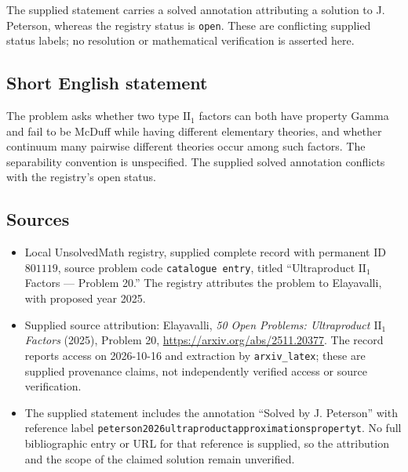 \documentclass[11pt]{article}
\begin{document}
The supplied statement carries a solved annotation attributing a solution to J. Peterson, whereas the registry status is \texttt{open}. These are conflicting supplied status labels; no resolution or mathematical verification is asserted here.
\subsection{Short English statement}
The problem asks whether two type \(\mathrm{II}_1\) factors can both have property Gamma and fail to be McDuff while having different elementary theories, and whether continuum many pairwise different theories occur among such factors. The separability convention is unspecified. The supplied solved annotation conflicts with the registry's open status.
\subsection{Sources}
\begin{itemize}
\item Local UnsolvedMath registry, supplied complete record with permanent ID \(801119\), source problem code \texttt{catalogue entry}, titled ``Ultraproduct \(\mathrm{II}_1\) Factors --- Problem 20.'' The registry attributes the problem to Elayavalli, with proposed year 2025.
\item Supplied source attribution: Elayavalli, \emph{50 Open Problems: Ultraproduct \(\mathrm{II}_1\) Factors} (2025), Problem 20, \url{https://arxiv.org/abs/2511.20377}. The record reports access on 2026-10-16 and extraction by \texttt{arxiv\_latex}; these are supplied provenance claims, not independently verified access or source verification.
\item The supplied statement includes the annotation ``Solved by J. Peterson'' with reference label \texttt{peterson2026ultraproductapproximationspropertyt}. No full bibliographic entry or URL for that reference is supplied, so the attribution and the scope of the claimed solution remain unverified.
\end{itemize}
\end{document}
